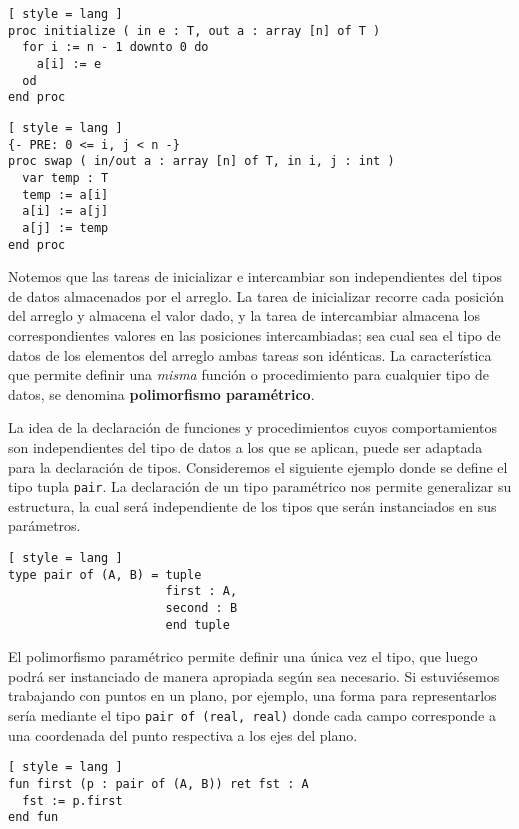 \begin{lstlisting}[ style = lang ]
proc initialize ( in e : T, out a : array [n] of T )
  for i := n - 1 downto 0 do
    a[i] := e
  od
end proc
\end{lstlisting}

\begin{lstlisting}[ style = lang ]
{- PRE: 0 <= i, j < n -}
proc swap ( in/out a : array [n] of T, in i, j : int )
  var temp : T
  temp := a[i]
  a[i] := a[j]
  a[j] := temp
end proc
\end{lstlisting}

Notemos que las tareas de inicializar e intercambiar son independientes del tipos de datos almacenados por el arreglo.
La tarea de inicializar recorre cada posición del arreglo y almacena el valor dado, y la tarea de intercambiar almacena los correspondientes valores en las posiciones intercambiadas; sea cual sea el tipo de datos de los elementos del arreglo ambas tareas son idénticas.
La característica que permite definir una \textit{misma} función o procedimiento para cualquier tipo de datos, se denomina \textbf{polimorfismo paramétrico}.

La idea de la declaración de funciones y procedimientos cuyos comportamientos son independientes del tipo de datos a los que se aplican, puede ser adaptada para la declaración de tipos.
Consideremos el siguiente ejemplo donde se define el tipo tupla \lstinline[style = lang]{pair}.
La declaración de un tipo paramétrico nos permite generalizar su estructura, la cual será independiente de los tipos que serán instanciados en sus parámetros.

\begin{lstlisting}[ style = lang ]
type pair of (A, B) = tuple
                      first : A,
                      second : B
                      end tuple
\end{lstlisting}

El polimorfismo paramétrico permite definir una única vez el tipo, que luego podrá ser instanciado de manera apropiada según sea necesario.
Si estuviésemos trabajando con puntos en un plano, por ejemplo, una forma para representarlos sería mediante el tipo \lstinline[style = lang]{pair of (real, real)} donde cada campo corresponde a una coordenada del punto respectiva a los ejes del plano.

\begin{lstlisting}[ style = lang ]
fun first (p : pair of (A, B)) ret fst : A
  fst := p.first
end fun
\end{lstlisting}

